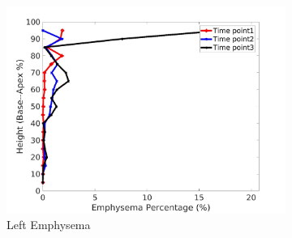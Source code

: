 \begin{figure}[H]
\begin{subfigure}{.42\linewidth}
  \includegraphics[width=\linewidth,trim={{.0\wd0} {.0\wd0} {.0\wd0} {.0\wd0}},clip]{QuantitativeAnalysis/Image/IPF21LeftLungEmphysemaDiseaseAgainstHeight.jpg} %
  \caption{Left Emphysema}
  \label{fig:IPF21DiseaseAgainstHeightMain-g} 
\end{subfigure} 
\begin{subfigure}{.42\linewidth}%

\end{subfigure}
\end{figure}
